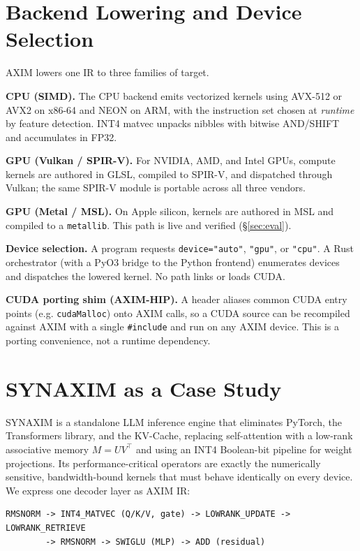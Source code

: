 \documentclass[11pt,a4paper]{article}
\begin{document}
\section{Backend Lowering and Device Selection}\label{sec:backend}

AXIM lowers one IR to three families of target.

\textbf{CPU (SIMD).} The CPU backend emits vectorized kernels using AVX-512 or AVX2 on
x86-64 and NEON on ARM, with the instruction set chosen at \emph{runtime} by feature
detection. INT4 matvec unpacks nibbles with bitwise AND/SHIFT and accumulates in FP32.

\textbf{GPU (Vulkan / SPIR-V).} For NVIDIA, AMD, and Intel GPUs, compute kernels are authored
in GLSL, compiled to SPIR-V, and dispatched through Vulkan; the same SPIR-V module is
portable across all three vendors.

\textbf{GPU (Metal / MSL).} On Apple silicon, kernels are authored in MSL and compiled to a
\texttt{metallib}. This path is live and verified (\S\ref{sec:eval}).

\textbf{Device selection.} A program requests \texttt{device="auto"}, \texttt{"gpu"}, or
\texttt{"cpu"}. A Rust orchestrator (with a PyO3 bridge to the Python frontend) enumerates
devices and dispatches the lowered kernel. No path links or loads CUDA.

\textbf{CUDA porting shim (AXIM-HIP).} A header aliases common CUDA entry points (e.g.
\texttt{cudaMalloc}) onto AXIM calls, so a CUDA source can be recompiled against AXIM with a
single \texttt{\#include} and run on any AXIM device. This is a porting convenience, not a
runtime dependency.

\section{SYNAXIM as a Case Study}\label{sec:casestudy}

SYNAXIM is a standalone LLM inference engine that eliminates PyTorch, the Transformers
library, and the KV-Cache, replacing self-attention with a low-rank associative memory
$M = U V^\top$ and using an INT4 Boolean-bit pipeline for weight projections. Its
performance-critical operators are exactly the numerically sensitive, bandwidth-bound
kernels that must behave identically on every device. We express one decoder layer as AXIM
IR:

\begin{lstlisting}
RMSNORM -> INT4_MATVEC (Q/K/V, gate) -> LOWRANK_UPDATE -> LOWRANK_RETRIEVE
        -> RMSNORM -> SWIGLU (MLP) -> ADD (residual)
\end{lstlisting}
\end{document}
